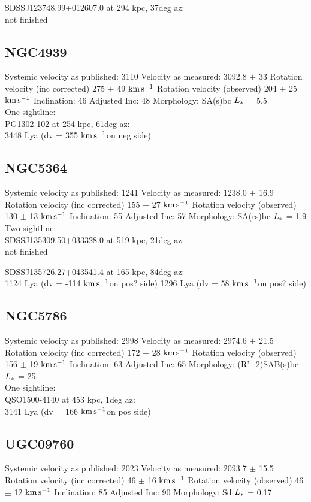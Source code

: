 \documentclass[iop]{emulateapj-rtx4}
\newcommand{\kms}{$\rm km\, s^{-1}$}
\begin{document}
SDSSJ123748.99+012607.0 at  294 kpc, 37deg az: \\
not finished


\subsection{NGC4939}
Systemic velocity as published: 3110
Velocity as measured: 3092.8 $\pm$ 33
Rotation velocity (inc corrected) 275 $\pm$ 49 \kms
Rotation velocity (observed) 204 $\pm$ 25 \kms
Inclination: 46
Adjusted Inc: 48
Morphology: SA(s)bc
$L_{\**}$ = 5.5 \\

One sightline: \\
PG1302-102 at 254 kpc, 61deg az: \\
3448 Lya (dv = 355 \kms on neg side)



\subsection{NGC5364}
Systemic velocity as published: 1241
Velocity as measured: 1238.0 $\pm$ 16.9
Rotation velocity (inc corrected) 155 $\pm$ 27 \kms
Rotation velocity (observed) 130 $\pm$ 13 \kms
Inclination: 55
Adjusted Inc: 57
Morphology: SA(rs)bc
$L_{\**}$ = 1.9 \\

Two sightline: \\
SDSSJ135309.50+033328.0 at 519 kpc, 21deg az: \\
not finished

SDSSJ135726.27+043541.4 at 165 kpc, 84deg az: \\
1124 Lya (dv = -114 \kms on pos? side)
1296 Lya (dv = 58 \kms on pos? side)



\subsection{NGC5786}
Systemic velocity as published: 2998
Velocity as measured: 2974.6 $\pm$ 21.5
Rotation velocity (inc corrected) 172 $\pm$ 28 \kms
Rotation velocity (observed) 156 $\pm$ 19 \kms
Inclination: 63
Adjusted Inc: 65
Morphology: (R'\_2)SAB(s)bc
$L_{\**}$ = 25 \\

One sightline: \\
QSO1500-4140 at 453 kpc, 1deg az: \\
3141 Lya (dv = 166 \kms on pos side)


\subsection{UGC09760}
Systemic velocity as published: 2023
Velocity as measured: 2093.7 $\pm$ 15.5
Rotation velocity (inc corrected) 46 $\pm$ 16 \kms
Rotation velocity (observed) 46 $\pm$ 12 \kms
Inclination: 85
Adjusted Inc: 90
Morphology: Sd
$L_{\**}$ = 0.17 \\
\end{document}

